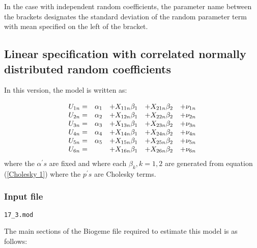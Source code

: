 \documentclass[12pt]{memoir}
\begin{document}
In the case with independent random coefficients, the parameter name between
the brackets designates the standard deviation of the random parameter term
with mean specified on the left of the bracket.

\subsection{Linear specification with correlated normally distributed random
coefficients}

In this version, the model is written as:%

\begin{equation}%
\begin{array}
[c]{ccccc}%
U_{1n}= & \alpha_{1} & +X_{11n}\beta_{1} & +X_{21n}\beta_{2} & +\nu_{1n}\\
U_{2n}= & \alpha_{2} & +X_{12n}\beta_{1} & +X_{22n}\beta_{2} & +\nu_{2n}\\
U_{3n}= & \alpha_{3} & +X_{13n}\beta_{1} & +X_{23n}\beta_{2} & +\nu_{3n}\\
U_{4n}= & \alpha_{4} & +X_{14n}\beta_{1} & +X_{24n}\beta_{2} & +\nu_{4n}\\
U_{5n}= & \alpha_{5} & +X_{15n}\beta_{1} & +X_{25n}\beta_{2} & +\nu_{5n}\\
U_{6n}= &  & +X_{16n}\beta_{1} & +X_{26n}\beta_{2} & +\nu_{6n}%
\end{array}
\end{equation}
where the $\alpha^{\prime}s$ are fixed and where each $\beta_{k},k=1,2$ are
generated from equation (\ref{Cholesky 1}) where the $p^{\prime}s$ are
Cholesky terms. \ 

\subsubsection{Input file}
\label{sec:ex-corr}

\begin{flushright}
\verb+17_3.mod+
\end{flushright}

The main sections of the Biogeme file required to estimate this model is as follows:
\end{document}
